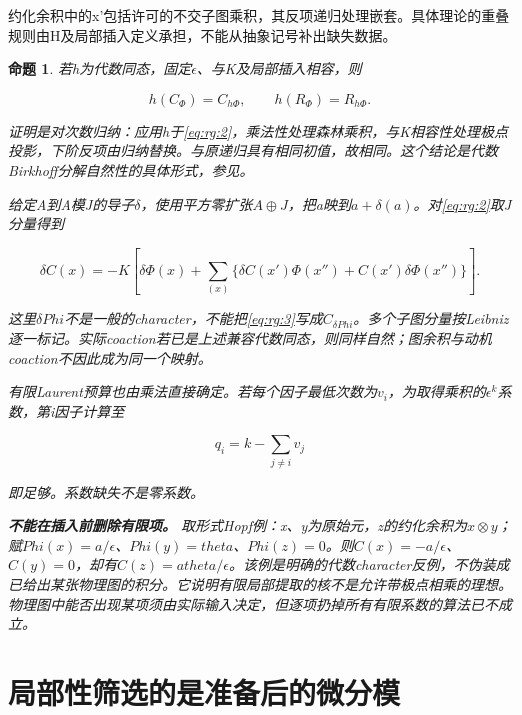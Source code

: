 \documentclass[11pt,a4paper,oneside]{ctexrep}
\theoremstyle{cnplain}
\newtheorem{proposition}[theorem]{命题}
\theoremstyle{definition}
\theoremstyle{remark}
\begin{document}
约化余积中的x'包括许可的不交子图乘积，其反项递归处理嵌套。具体理论的重叠规则由H及局部插入定义承担，不能从抽象记号补出缺失数据。

\begin{proposition}

\label{thm:rg:2.1} 若h为代数同态，固定\(\epsilon\)、与K及局部插入相容，则

\begin{equation}
h(C_\Phi)=C_{h\Phi},\qquad h(R_\Phi)=R_{h\Phi}.
\end{equation}

证明是对次数归纳：应用h于\eqref{eq:rg:2}，乘法性处理森林乘积，与K相容性处理极点投影，下阶反项由归纳替换。与原递归具有相同初值，故相同。这个结论是代数Birkhoff分解自然性的具体形式，参见\cite[Theorem3.2]{guozhang}。

给定A到A模J的导子\(\delta\)，使用平方零扩张\(A\oplus J\)，把a映到\(a+\delta (a)\)。对\eqref{eq:rg:2}取J分量得到

\begin{equation}
\delta C(x)=-K\left[\delta\Phi(x)+
 \sum_{(x)}\{\delta C(x')\Phi(x'')+
                 C(x')\delta\Phi(x'')\}\right].    \label{eq:rg:3}
\end{equation}

这里\(\delta  Phi\)不是一般的character，不能把\eqref{eq:rg:3}写成\(C_{\delta  Phi}\)。多个子图分量按Leibniz逐一标记。实际coaction若已是上述兼容代数同态，则同样自然；图余积与动机coaction不因此成为同一个映射。

有限Laurent预算也由乘法直接确定。若每个因子最低次数为\(v_i\)，为取得乘积的\(\epsilon ^k\)系数，第i因子计算至

\begin{equation}
q_i=k-\sum_{j\ne i}v_j                            \label{eq:rg:4}
\end{equation}

即足够。系数缺失不是零系数。

\textbf{不能在插入前删除有限项。} 取形式Hopf例：x、y为原始元，z的约化余积为\(x\otimes y\)；赋\(Phi(x)=a/\epsilon\)、\(Phi(y)=theta\)、\(Phi(z)=0\)。则\(C(x)=-a/\epsilon\)、\(C(y)=0\)，却有\(C(z)=a theta/\epsilon\)。该例是明确的代数character反例，不伪装成已给出某张物理图的积分。它说明有限局部提取的核不是允许带极点相乘的理想。物理图中能否出现某项须由实际输入决定，但逐项扔掉所有有限系数的算法已不成立。

\end{proposition}

\section{局部性筛选的是准备后的微分模}\label{sec:rg:3}
\end{document}

